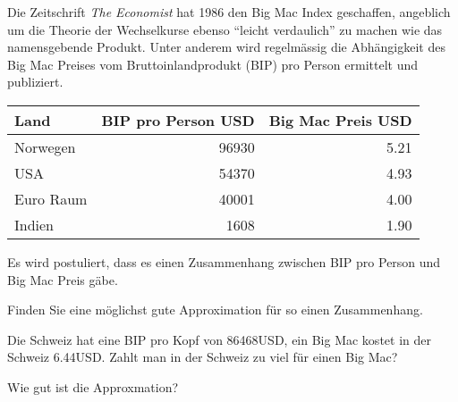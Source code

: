 Die Zeitschrift {\em The Economist} hat 1986 den Big Mac Index geschaffen,
angeblich um die Theorie der Wechselkurse ebenso ``leicht verdaulich''
zu machen wie das namensgebende Produkt.
Unter anderem wird regelmässig die Abhängigkeit des Big Mac Preises
vom Bruttoinlandprodukt (BIP) pro Person ermittelt und publiziert.
\begin{center}
\begin{tabular}{|l|r|r|}
\hline
Land&BIP pro Person USD&Big Mac Preis USD\\
\hline
Norwegen   &96930&5.21\\
USA        &54370&4.93\\
Euro Raum  &40001&4.00\\
Indien     & 1608&1.90\\
\hline
\end{tabular}
\end{center}
Es wird postuliert, dass es einen Zusammenhang zwischen 
BIP pro Person und Big Mac Preis gäbe.

\begin{teilaufgaben}
\item Finden Sie eine möglichst gute Approximation für so einen Zusammenhang.
\item Die Schweiz hat eine BIP pro Kopf von 86468USD, ein Big Mac kostet
in der Schweiz 6.44USD.
Zahlt man in der Schweiz zu viel für einen Big Mac?
\item Wie gut ist die Approxmation?
\end{teilaufgaben}

